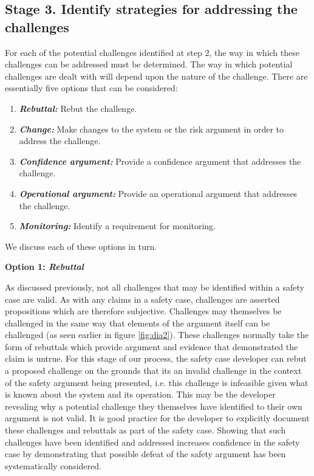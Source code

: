 \subsection{Stage 3. Identify strategies for addressing the challenges}

For each of the potential challenges identified at step 2, the way in which these challenges can be addressed must be determined. The way in which potential challenges are dealt with will depend upon the nature of the challenge. There are essentially five options that can be considered: 

\begin{enumerate}
    \item \textbf{\textit{Rebuttal:}} Rebut the challenge.
    \item \textbf{\textit{Change:}} Make changes to the system or the risk argument in order to address the challenge.
    \item \textbf{\textit{Confidence argument:}} Provide a confidence argument that addresses the challenge. 
    \item \textbf{\textit{Operational argument:}} Provide an operational argument that addresses the challenge.
    \item \textbf{\textit{Monitoring:}} Identify a requirement for monitoring.
\end{enumerate}

We discuss each of these options in turn.

\textbf{Option 1: \textit{Rebuttal}}

As discussed previously, not all challenges that may be identified within a safety case are valid. As with any claims in a safety case, challenges are asserted propositions which are therefore subjective. Challenges may themselves be challenged in the same way that elements of the argument itself can be challenged (as seen earlier in figure \ref{fig:dia2}). These challenges normally take the form of rebuttals which provide argument and evidence that demonstrated the claim is untrue. For this stage of our process, the safety case developer can rebut a proposed challenge on the grounds that its an invalid challenge in the context of the safety argument being presented, i.e. this challenge is infeasible given what is known about the system and its operation. This may be the developer revealing why a potential challenge they themselves have identified to their own argument is not valid. It is good practice for the developer to explicitly document these challenges and rebuttals as part of the safety case. Showing that such challenges have been identified and addressed increases confidence in the safety case by demonstrating that possible defeat of the safety argument has been systematically considered.

